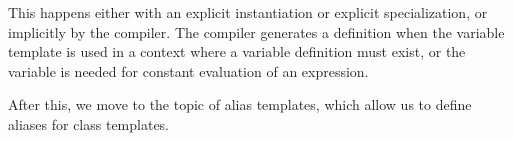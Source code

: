 This happens either with an explicit instantiation or explicit specialization, or implicitly by the compiler. The compiler generates a definition when the variable template is used in a context where a variable definition must exist, or the variable is needed for constant evaluation of an expression.

After this, we move to the topic of alias templates, which allow us to define aliases for class templates.








